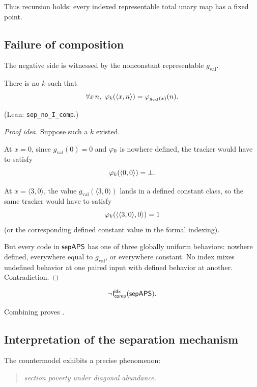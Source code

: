 \documentclass[11pt]{article}
\begin{document}
Thus recursion holds: every indexed representable total unary map has a fixed point.

\subsection{Failure of composition}

The negative side is witnessed by the nonconstant representable \(g_{\mathrm{val}}\).

\begin{lemma}\label{lem:no-tracker}
There is no \(k\) such that
\[
\forall x\,n,\ \varphi_k(\langle x,n\rangle)=\varphi_{g_{\mathrm{val}}(x)}(n).
\]
\end{lemma}
(Lean: \texttt{sep\_no\_I\_comp}.)

\begin{proof}[Proof idea]
Suppose such a \(k\) existed.

At \(x=0\), since \(g_{\mathrm{val}}(0)=0\) and \(\varphi_0\) is nowhere defined, the tracker would have to satisfy
\[
\varphi_k(\langle 0,0\rangle)=\bot.
\]

At \(x=\langle 3,0\rangle\), the value \(g_{\mathrm{val}}(\langle 3,0\rangle)\) lands in a defined constant class, so the same tracker would have to satisfy
\[
\varphi_k(\langle \langle 3,0\rangle,0\rangle)=1
\]
(or the corresponding defined constant value in the formal indexing).

But every code in \(\mathsf{sepAPS}\) has one of three globally uniform behaviors: nowhere defined, everywhere equal to \(g_{\mathrm{val}}\), or everywhere constant.  No index mixes undefined behavior at one paired input with defined behavior at another.  Contradiction.
\end{proof}

\begin{corollary}\label{cor:no-comp}
\[
\neg \mathsf{I}_{\mathsf{comp}}^{\mathsf{idx}}(\mathsf{sepAPS}).
\]
\end{corollary}

Combining  proves .

\subsection{Interpretation of the separation mechanism}

The countermodel exhibits a precise phenomenon:

\begin{quote}
\emph{section poverty under diagonal abundance.}
\end{quote}
\end{document}
